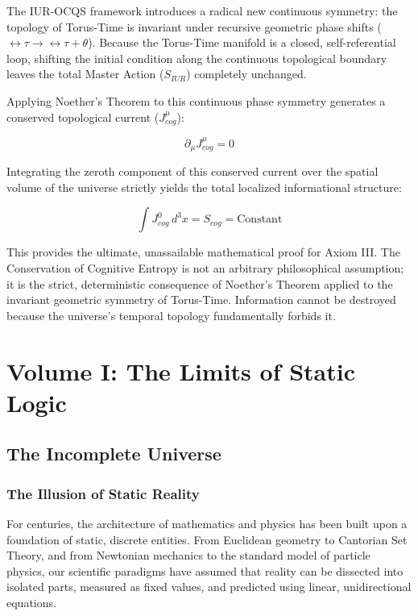 \documentclass[12pt,openany]{book}
\begin{document}
The IUR-OCQS framework introduces a radical new continuous symmetry: the topology of Torus-Time is invariant under recursive geometric phase shifts ($\leftrightarrow\tau \to \leftrightarrow\tau + \theta$). Because the Torus-Time manifold is a closed, self-referential loop, shifting the initial condition along the continuous topological boundary leaves the total Master Action ($S_{IUR}$) completely unchanged.

Applying Noether's Theorem to this continuous phase symmetry generates a conserved topological current ($J^\mu_{cog}$):

\begin{equation}
\partial_\mu J^\mu_{cog} = 0
\end{equation}

Integrating the zeroth component of this conserved current over the spatial volume of the universe strictly yields the total localized informational structure:

\begin{equation}
\int J^0_{cog} \, d^3x = S_{cog} = \text{Constant}
\end{equation}

This provides the ultimate, unassailable mathematical proof for Axiom III. The Conservation of Cognitive Entropy is not an arbitrary philosophical assumption; it is the strict, deterministic consequence of Noether's Theorem applied to the invariant geometric symmetry of Torus-Time. Information cannot be destroyed because the universe's temporal topology fundamentally forbids it.

\part[Volume I]{Volume I: The Limits of Static Logic}

\chapter{The Incomplete Universe}
\section{The Illusion of Static Reality}
For centuries, the architecture of mathematics and physics has been built upon a foundation of static, discrete entities. From Euclidean geometry to Cantorian Set Theory, and from Newtonian mechanics to the standard model of particle physics, our scientific paradigms have assumed that reality can be dissected into isolated parts, measured as fixed values, and predicted using linear, unidirectional equations. 
\end{document}
